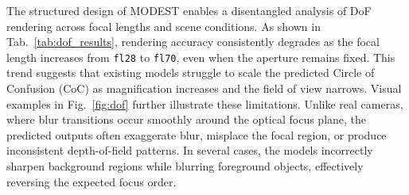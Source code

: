 The structured design of MODEST enables a disentangled analysis of DoF rendering across focal lengths and scene conditions. As shown in Tab.~\ref{tab:dof_results}, rendering accuracy consistently degrades as the focal length increases from \texttt{fl28} to \texttt{fl70}, even when the aperture remains fixed. This trend suggests that existing models struggle to scale the predicted Circle of Confusion (CoC) as magnification increases and the field of view narrows. Visual examples in Fig.~\ref{fig:dof} further illustrate these limitations. Unlike real cameras, where blur transitions occur smoothly around the optical focus plane, the predicted outputs often exaggerate blur, misplace the focal region, or produce inconsistent depth-of-field patterns. In several cases, the models incorrectly sharpen background regions while blurring foreground objects, effectively reversing the expected focus order.


